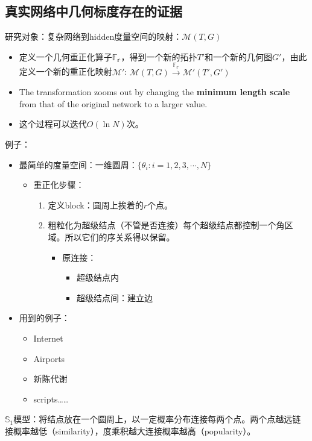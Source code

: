 \subsection{真实网络中几何标度存在的证据}

研究对象：复杂网络到hidden度量空间的映射：\(\mathcal M(T,G)\)

  \begin{itemize}
  \item
    定义一个几何重正化算子$\mathbb {F_r}$，得到一个新的拓扑$T'$和一个新的几何图$G'$，由此定义一个新的重正化映射$\mathcal{M}'$: $\mathcal{M}(T,G)\stackrel{\mathbb{F_r}}{\longrightarrow}\mathcal{M}'(T',G')$
  \item
    The transformation zooms out by changing the \textbf{minimum length
    scale} from that of the original network to a larger value.
  \item
    这个过程可以迭代\(O(\ln N)\)次。
  \end{itemize}
例子：

  \begin{itemize}
  \item
    最简单的度量空间：一维圆周：\(\{\theta_i:i=1,2,3,\cdots,N\}\)

    \begin{itemize}
    \item
      重正化步骤：

      \begin{enumerate}
      \def\labelenumi{\arabic{enumi}.}
      \item
        定义block：圆周上挨着的\(r\)个点。
      \item
        粗粒化为超级结点（不管是否连接）每个超级结点都控制一个角区域。所以它们的序关系得以保留。

        \begin{itemize}
        \item
          原连接：

          \begin{itemize}
          \item
            超级结点内
          \item
            超级结点间：建立边
          \end{itemize}
        \end{itemize}
      \end{enumerate}
    \end{itemize}
  \item
    用到的例子：

    \begin{itemize}
    \item
      Internet
    \item
      Airports
    \item
      新陈代谢
    \item
      scripts\ldots\ldots{}
    \end{itemize}
  \end{itemize}
\(\mathbb S_1\)模型：将结点放在一个圆周上，以一定概率分布连接每两个点。两个点越远链接概率越低（similarity），度乘积越大连接概率越高（popularity）。

